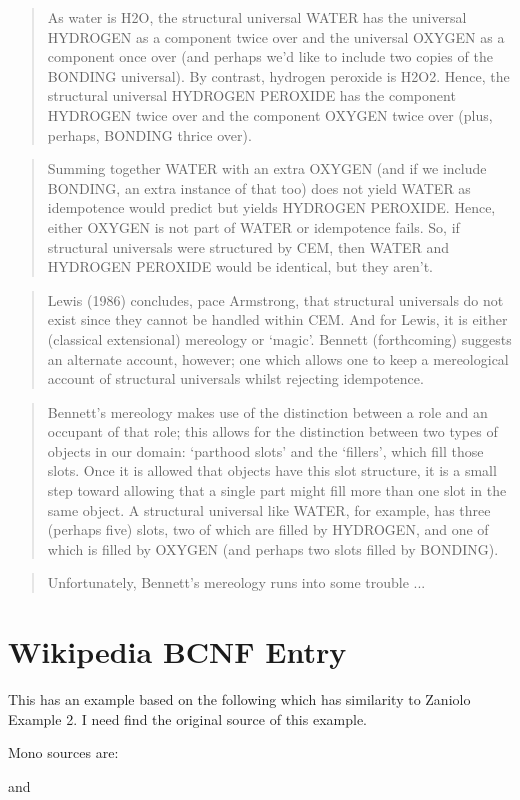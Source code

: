 \documentclass[10pt,a4paper]{scrartcl}
\renewcommand{\erpictureFolder}[0]{../SharedPictures}
\begin{document}
\begin{quote}
As water is H2O, the structural universal WATER has the universal HYDROGEN as a
component twice over and the universal OXYGEN as a component once over (and perhaps
we’d like to include two copies of the BONDING universal). By contrast, hydrogen peroxide
is H2O2. Hence, the structural universal HYDROGEN PEROXIDE has the component
HYDROGEN twice over and the component OXYGEN twice over (plus, perhaps, BONDING
thrice over).
\end{quote}
\begin{quote}
Summing together WATER with an extra OXYGEN (and if we include BONDING, an extra
instance of that too) does not yield WATER as idempotence would predict but yields
HYDROGEN PEROXIDE. Hence, either OXYGEN is not part of WATER or idempotence fails.
So, if structural universals were structured by CEM, then WATER and HYDROGEN PEROXIDE
would be identical, but they aren’t.
\end{quote}
\begin{quote}
Lewis (1986) concludes, pace Armstrong, that structural universals do not exist since they
cannot be handled within CEM. And for Lewis, it is either (classical extensional) mereology
or ‘magic’. Bennett (forthcoming) suggests an alternate account, however; one which allows
one to keep a mereological account of structural universals whilst rejecting idempotence.
\end{quote}
\begin{quote}
Bennett’s mereology makes use of the distinction between a role and an occupant of that
role; this allows for the distinction between two types of objects in our domain: ‘parthood
slots’ and the ‘fillers’, which fill those slots. Once it is allowed that objects have this slot structure, it is a small step toward allowing that a single part might fill more than one slot in the
same object. A structural universal like WATER, for example, has three (perhaps five) slots,
two of which are filled by HYDROGEN, and one of which is filled by OXYGEN (and perhaps
two slots filled by BONDING).
\end{quote}
\begin{quote}
Unfortunately, Bennett’s mereology runs into some trouble ...
\end{quote}

\section{Wikipedia BCNF Entry}
This has an example based on the following which has similarity to Zaniolo Example 2.
I need find the original source of this example.
\begin{center}

\end{center}
Mono sources are:
\newcommand{\attr}[1]{#1}
\renewcommand{\attr}[1]{\psframebox[linecolor=red,framearc=.1]{#1}}
\newcommand{\attrtype}[1]{#1}
\renewcommand{\attrtype}[1]{\psframebox[linecolor=blue,framearc=.1]{#1}}
\newcommand{\etype}[1]{#1}
\renewcommand{\etype}[1]{\psframebox[linecolor=red,framearc=.1]{#1}}
\begin{center}

\end{center}
and
\end{document}
